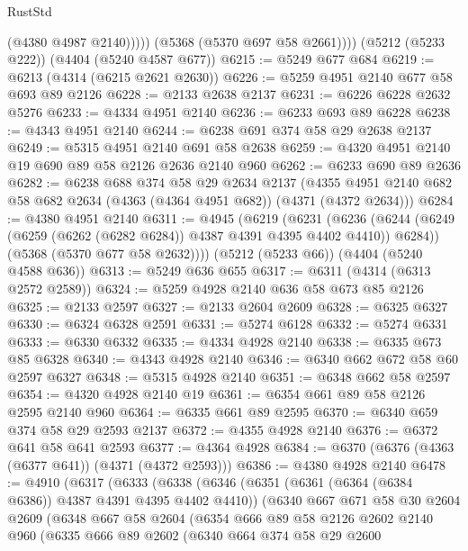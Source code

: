 \begin{lexlean}{RustStd}
\begin{coremodule}
                (@4380 @4987 @2140)))))
        (@5368 (@5370 @697 @58 @2661))))
    (@5212 (@5233 @222))
    (@4404 (@5240 @4587 @677))
@6215 := @5249 @677 @684
@6219 := @6213 (@4314 (@6215 @2621 @2630))
@6226 := @5259 @4951 @2140 @677 @58 @693 @89 @2126
@6228 := @2133 @2638 @2137
@6231 := @6226 @6228 @2632 @5276
@6233 := @4334 @4951 @2140
@6236 := @6233 @693 @89 @6228
@6238 := @4343 @4951 @2140
@6244 := @6238 @691 @374 @58 @29 @2638 @2137
@6249 := @5315 @4951 @2140 @691 @58 @2638
@6259 := @4320 @4951 @2140 @19 @690 @89 @58 @2126 @2636 @2140 @960
@6262 := @6233 @690 @89 @2636
@6282 := @6238
    @688
    @374
    @58
    @29
    @2634
    @2137
    (@4355 @4951 @2140 @682 @58 @682 @2634 (@4363 (@4364 @4951 @682)) (@4371 (@4372 @2634)))
@6284 := @4380 @4951 @2140
@6311 := @4945
    (@6219
      (@6231
        (@6236 (@6244 (@6249 (@6259 (@6262 (@6282 @6284)) @4387 @4391 @4395 @4402 @4410)) @6284))
        (@5368 (@5370 @677 @58 @2632))))
    (@5212 (@5233 @66))
    (@4404 (@5240 @4588 @636))
@6313 := @5249 @636 @655
@6317 := @6311 (@4314 (@6313 @2572 @2589))
@6324 := @5259 @4928 @2140 @636 @58 @673 @85 @2126
@6325 := @2133 @2597
@6327 := @2133 @2604 @2609
@6328 := @6325 @6327
@6330 := @6324 @6328 @2591
@6331 := @5274 @6128
@6332 := @5274 @6331
@6333 := @6330 @6332
@6335 := @4334 @4928 @2140
@6338 := @6335 @673 @85 @6328
@6340 := @4343 @4928 @2140
@6346 := @6340 @662 @672 @58 @60 @2597 @6327
@6348 := @5315 @4928 @2140
@6351 := @6348 @662 @58 @2597
@6354 := @4320 @4928 @2140 @19
@6361 := @6354 @661 @89 @58 @2126 @2595 @2140 @960
@6364 := @6335 @661 @89 @2595
@6370 := @6340 @659 @374 @58 @29 @2593 @2137
@6372 := @4355 @4928 @2140
@6376 := @6372 @641 @58 @641 @2593
@6377 := @4364 @4928
@6384 := @6370 (@6376 (@4363 (@6377 @641)) (@4371 (@4372 @2593)))
@6386 := @4380 @4928 @2140
@6478 := @4910
    (@6317
      (@6333
        (@6338
          (@6346
            (@6351 (@6361 (@6364 (@6384 @6386)) @4387 @4391 @4395 @4402 @4410))
            (@6340
              @667
              @671
              @58
              @30
              @2604
              @2609
              (@6348
                @667
                @58
                @2604
                (@6354
                  @666
                  @89
                  @58
                  @2126
                  @2602
                  @2140
                  @960
                  (@6335
                    @666
                    @89
                    @2602
                    (@6340
                      @664
                      @374
                      @58
                      @29
                      @2600

\end{coremodule}
\end{lexlean}
